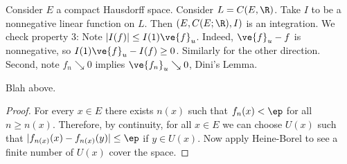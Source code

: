 Consider $E$ a compact Hausdorff space. Consider $L=C(E,\R)$. Take $I$ to be a nonnegative linear function on $L$.
Then $(E,C(E;\R),I)$ is an integration. We check property 3: Note $|I(f)|\le I(1)\ve{f}_u$. Indeed, $\ve{f}_u-f$ is nonnegative, so $I(1)\ve{f}_u-I(f)\ge 0$. Similarly for the other direction. Second, note $f_n\searrow 0$ implies $\ve{f_n}_u\searrow 0$, Dini's Lemma.
\begin{lem}[Dini]
Blah above.
\end{lem}
\begin{proof}
For every $x\in E$ there exists $n(x)$ such that $f_n(x)<\ep$ for all $n\ge n(x)$. Therefore, by continuity, for all $x\in E$ we can choose $U(x)$ such that $|f_{n(x)}(x)-f_{n(x)}(y)|\le \ep$ if $y\in U(x)$. Now apply Heine-Borel to see a finite number of $U(x)$ cover the space.
\end{proof}
